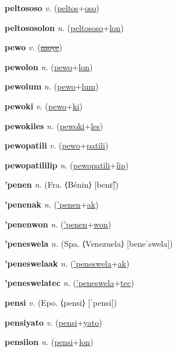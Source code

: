 \textbf{\hypertarget{peltososo}{peltososo}} \textit{v.} (\hyperlink{peltos}{peltos}+\allowbreak \hyperlink{oso}{oso})


\textbf{\hypertarget{peltososolon}{peltososolon}} \textit{n.} (\hyperlink{peltososo}{peltososo}+\allowbreak \hyperlink{lon}{lon})


\textbf{\hypertarget{pewo}{pewo}} \textit{v.} (\hyperlink{moye}{\sout{moye}})


\textbf{\hypertarget{pewolon}{pewolon}} \textit{n.} (\hyperlink{pewo}{pewo}+\allowbreak \hyperlink{lon}{lon})


\textbf{\hypertarget{pewolum}{pewolum}} \textit{n.} (\hyperlink{pewo}{pewo}+\allowbreak \hyperlink{lum}{lum})


\textbf{\hypertarget{pewoki}{pewoki}} \textit{v.} (\hyperlink{pewo}{pewo}+\allowbreak \hyperlink{ki}{ki})


\textbf{\hypertarget{pewokiles}{pewokiles}} \textit{n.} (\hyperlink{pewoki}{pewoki}+\allowbreak \hyperlink{les}{les})


\textbf{\hypertarget{pewopatili}{pewopatili}} \textit{v.} (\hyperlink{pewo}{pewo}+\allowbreak \hyperlink{patili}{patili})


\textbf{\hypertarget{pewopatililip}{pewopatililip}} \textit{n.} (\hyperlink{pewopatili}{pewopatili}+\allowbreak \hyperlink{lip}{lip})


\textbf{\hypertarget{'penen}{'penen}} \textit{n.} (Fra. ⟨Bénin⟩ [benɛ̃])


\textbf{\hypertarget{'penenak}{'penenak}} \textit{n.} (\hyperlink{'penen}{'penen}+\allowbreak \hyperlink{ak}{ak})


\textbf{\hypertarget{'penenwon}{'penenwon}} \textit{n.} (\hyperlink{'penen}{'penen}+\allowbreak \hyperlink{won}{won})


\textbf{\hypertarget{'peneswela}{'peneswela}} \textit{n.} (Spa. ⟨Venezuela⟩ [beneˈswela])


\textbf{\hypertarget{'peneswelaak}{'peneswelaak}} \textit{n.} (\hyperlink{'peneswela}{'peneswela}+\allowbreak \hyperlink{ak}{ak})


\textbf{\hypertarget{'peneswelatec}{'peneswelatec}} \textit{n.} (\hyperlink{'peneswela}{'peneswela}+\allowbreak \hyperlink{tec}{tec})


\textbf{\hypertarget{pensi}{pensi}} \textit{v.} (Epo. ⟨pensi⟩ [ˈpensi])


\textbf{\hypertarget{pensiyato}{pensiyato}} \textit{v.} (\hyperlink{pensi}{pensi}+\allowbreak \hyperlink{yato}{yato})


\textbf{\hypertarget{pensilon}{pensilon}} \textit{n.} (\hyperlink{pensi}{pensi}+\allowbreak \hyperlink{lon}{lon})


